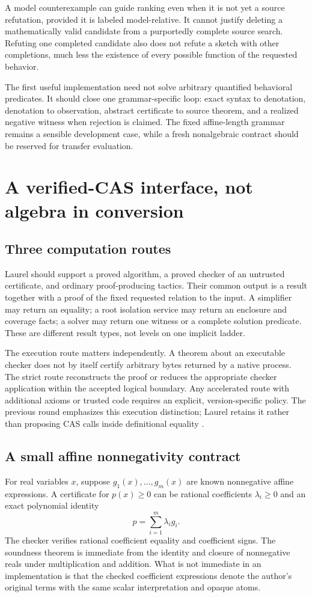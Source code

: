\documentclass[11pt,a4paper]{article}
\theoremstyle{definition}
\theoremstyle{remark}
\begin{document}
A model counterexample can guide ranking even when it is not yet a source refutation, provided it is labeled model-relative. It cannot justify deleting a mathematically valid candidate from a purportedly complete source search. Refuting one completed candidate also does not refute a sketch with other completions, much less the existence of every possible function of the requested behavior.

The first useful implementation need not solve arbitrary quantified behavioral predicates. It should close one grammar-specific loop: exact syntax to denotation, denotation to observation, abstract certificate to source theorem, and a realized negative witness when rejection is claimed. The fixed affine-length grammar remains a sensible development case, while a fresh nonalgebraic contract should be reserved for transfer evaluation.

\section{A verified-CAS interface, not algebra in conversion}\label{sec:cas}
\subsection{Three computation routes}
Laurel should support a proved algorithm, a proved checker of an untrusted certificate, and ordinary proof-producing tactics. Their common output is a result together with a proof of the fixed requested relation to the input. A simplifier may return an equality; a root isolation service may return an enclosure and coverage facts; a solver may return one witness or a complete solution predicate. These are different result types, not levels on one implicit ladder.

The execution route matters independently. A theorem about an executable checker does not by itself certify arbitrary bytes returned by a native process. The strict route reconstructs the proof or reduces the appropriate checker application within the accepted logical boundary. Any accelerated route with additional axioms or trusted code requires an explicit, version-specific policy. The previous round emphasizes this execution distinction; Laurel retains it rather than proposing CAS calls inside definitional equality \cite{r3a,r3b}.

\subsection{A small affine nonnegativity contract}
For real variables $x$, suppose $g_1(x),\ldots,g_m(x)$ are known nonnegative affine expressions. A certificate for $p(x)\ge0$ can be rational coefficients $\lambda_i\ge0$ and an exact polynomial identity
\[
 p=\sum_{i=1}^{m}\lambda_i g_i.
\]
The checker verifies rational coefficient equality and coefficient signs. The soundness theorem is immediate from the identity and closure of nonnegative reals under multiplication and addition. What is not immediate in an implementation is that the checked coefficient expressions denote the author's original terms with the same scalar interpretation and opaque atoms.
\end{document}

